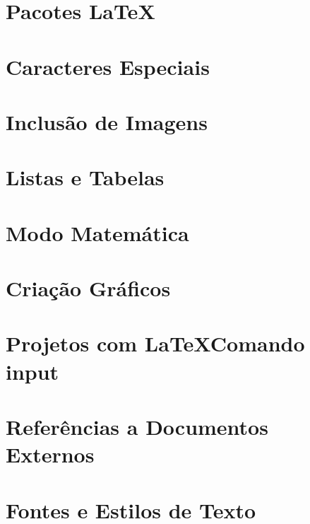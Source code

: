 

\section{Pacotes \LaTeX}
\label{chap.pacoteslatex}


\section{Caracteres Especiais}
\label{chap.caracteresespeciais}


\section{Inclusão de Imagens}
\label{chap.inclusaodeimagens}


\section{Listas e Tabelas}
\label{chap.listasetabelas}



\section{Modo Matemática}
\label{chap.modomatematica}


\section{Criação Gráficos}
\label{chap.criacaograficos}


\section{Projetos com \LaTeX Comando input}
\label{chap.projetoscomlatexcomandoinput}


\section{Referências a Documentos Externos}
\label{chap.referenciasadocumentosexternos}


\section{Fontes e Estilos de Texto}
\label{chap.fonteselinguagens}

